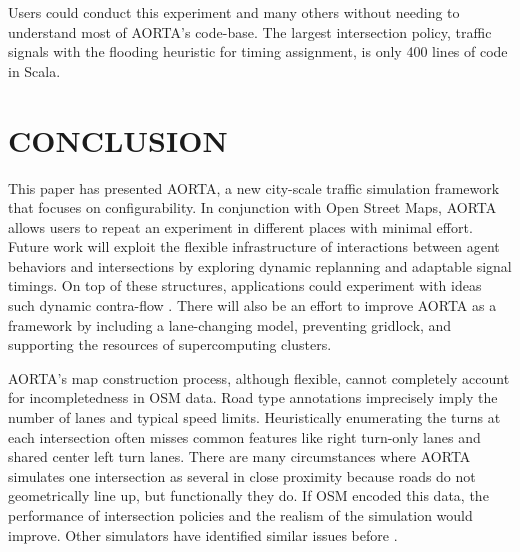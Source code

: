 \documentclass[letterpaper, 10 pt, conference]{ieeeconf}  %
\begin{document}
Users could conduct this experiment and many others without needing to
understand most of AORTA's code-base. The largest intersection policy, traffic
signals with the flooding heuristic for timing assignment, is only 400 lines of
code in Scala.


\section{CONCLUSION}
\label{sec:conclusion}

This paper has presented AORTA, a new city-scale traffic simulation framework
that focuses on configurability. In conjunction with Open Street Maps, AORTA
allows users to repeat an experiment in different places with minimal effort.
Future work will exploit the flexible infrastructure of interactions between
agent behaviors and intersections by exploring dynamic replanning and adaptable
signal timings. On top of these structures, applications could experiment with
ideas such dynamic contra-flow \cite{ITSC11-hausknecht}.  There will also be an
effort to improve AORTA as a framework by including a lane-changing model,
preventing gridlock, and supporting the resources of supercomputing clusters.

AORTA's map construction process, although flexible, cannot completely account
for incompletedness in OSM data. Road type annotations imprecisely imply the
number of lanes and typical speed limits. Heuristically enumerating the turns at
each intersection often misses common features like right turn-only lanes and
shared center left turn lanes. There are many circumstances where AORTA
simulates one intersection as several in close proximity because roads do not
geometrically line up, but functionally they do.  If OSM encoded this data, the
performance of intersection policies and the realism of the simulation would
improve. Other simulators have identified similar issues before
\cite{Krajzewicz_Hertkorn_Ringel_Wagner_2005}.


\addtolength{\textheight}{-12cm}  %
\end{document}
